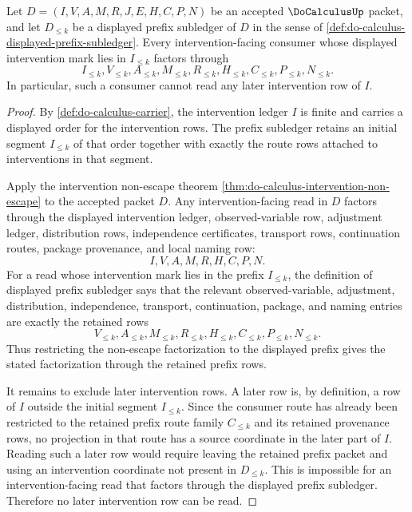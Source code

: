 \begin{theorem}
\label{thm:do-calculus-intervention-prefix-locality}
Let $D=(I,V,A,M,R,J,E,H,C,P,N)$ be an accepted $\DoCalculusUp$ packet, and let $D_{\leq k}$ be a displayed prefix subledger of $D$ in the sense of \autoref{def:do-calculus-displayed-prefix-subledger}. Every intervention-facing consumer whose displayed intervention mark lies in $I_{\leq k}$ factors through
$$
I_{\leq k},V_{\leq k},A_{\leq k},M_{\leq k},R_{\leq k},H_{\leq k},C_{\leq k},P_{\leq k},N_{\leq k}.
$$
In particular, such a consumer cannot read any later intervention row of $I$.
\end{theorem}
\begin{proof}
By \autoref{def:do-calculus-carrier}, the intervention ledger $I$ is finite and carries a displayed order for the intervention rows. The prefix subledger retains an initial segment $I_{\leq k}$ of that order together with exactly the route rows attached to interventions in that segment.

Apply the intervention non-escape theorem \autoref{thm:do-calculus-intervention-non-escape} to the accepted packet $D$. Any intervention-facing read in $D$ factors through the displayed intervention ledger, observed-variable row, adjustment ledger, distribution rows, independence certificates, transport rows, continuation routes, package provenance, and local naming row:
$$
I,V,A,M,R,H,C,P,N.
$$
For a read whose intervention mark lies in the prefix $I_{\leq k}$, the definition of displayed prefix subledger says that the relevant observed-variable, adjustment, distribution, independence, transport, continuation, package, and naming entries are exactly the retained rows
$$
V_{\leq k},A_{\leq k},M_{\leq k},R_{\leq k},H_{\leq k},C_{\leq k},P_{\leq k},N_{\leq k}.
$$
Thus restricting the non-escape factorization to the displayed prefix gives the stated factorization through the retained prefix rows.

It remains to exclude later intervention rows. A later row is, by definition, a row of $I$ outside the initial segment $I_{\leq k}$. Since the consumer route has already been restricted to the retained prefix route family $C_{\leq k}$ and its retained provenance rows, no projection in that route has a source coordinate in the later part of $I$. Reading such a later row would require leaving the retained prefix packet and using an intervention coordinate not present in $D_{\leq k}$. This is impossible for an intervention-facing read that factors through the displayed prefix subledger. Therefore no later intervention row can be read.
\end{proof}

